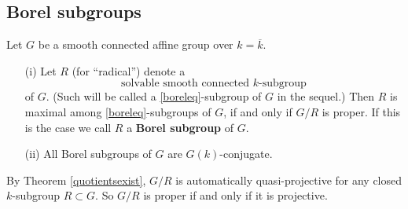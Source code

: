 \documentclass[10pt]{article}
\renewcommand{\(}{\left(}
\renewcommand{\)}{\right)}
\numberwithin{thm}{subsection}
\begin{document}
\subsection{Borel subgroups}
\begin{thm}\label{borelsexist}
Let $G$ be a smooth connected affine group over $k=\overline{k}$.
\begin{itemize}
\item[(i)]Let $R$ (for ``radical'') denote a 
\begin{equation*}\label{boreleq}\tag{$\dagger$}
  \text{solvable smooth connected $k$-subgroup}
\end{equation*}
of $G$. (Such will be called a \eqref{boreleq}-subgroup of $G$ in the sequel.) 
Then $R$ is maximal among \eqref{boreleq}-subgroups of $G$,
if and only if $G/R$ is proper.
If this is the case we call $R$ a \textbf{Borel subgroup} of $G$.

\item[(ii)] All Borel subgroups of $G$ are $G(k)$-conjugate.
\end{itemize}
\end{thm}
\begin{rem}\label{}
By Theorem \ref{quotientsexist}, $G/R$ is automatically quasi-projective
for any closed $k$-subgroup $R\subset G$.
So $G/R$ is proper if and only if it is projective.
\end{rem}
\end{document}
